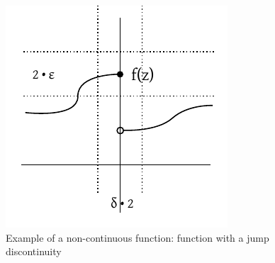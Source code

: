 \documentclass[a4paper,landscape,twocolumn]{article}
\theoremstyle{definition}
\begin{document}
\begin{figure}[t]
  \begin{center}
    \includegraphics{img/non-continous_function.pdf}
    \caption{Example of a non-continuous function: function with a jump discontinuity}
    \label{img:noncontf}
  \end{center}
\end{figure}
\end{document}
